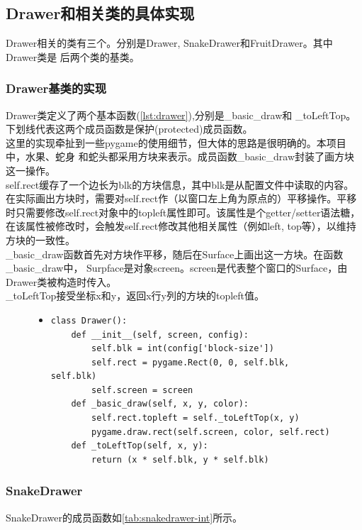 \documentclass[a4paper]{article}
\begin{document}
\subsection{Drawer和相关类的具体实现}
Drawer相关的类有三个。分别是Drawer, SnakeDrawer和FruitDrawer。其中Drawer类是
后两个类的基类。
\subsubsection{Drawer基类的实现}
Drawer类定义了两个基本函数(\autoref{lst:drawer}),分别是\_basic\_draw和
\_toLeftTop。下划线代表这两个成员函数是保护(protected)成员函数。\\

这里的实现牵扯到一些pygame的使用细节，但大体的思路是很明确的。本项目中，水果、蛇身
和蛇头都采用方块来表示。成员函数\_basic\_draw封装了画方块这一操作。\\

self.rect缓存了一个边长为blk的方块信息，其中blk是从配置文件中读取的内容。
在实际画出方块时，需要对self.rect作（以窗口左上角为原点的）平移操作。平移
时只需要修改self.rect对象中的topleft属性即可。该属性是个getter/setter语法糖，
在该属性被修改时，会触发self.rect修改其他相关属性（例如left, top等），以维持
方块的一致性。\\

\_basic\_draw函数首先对方块作平移，随后在Surface上画出这一方块。在函数\_basic\_draw中，
Surpface是对象screen。screen是代表整个窗口的Surface，由Drawer类被构造时传入。\\

\_toLeftTop接受坐标x和y，返回x行y列的方块的topleft值。
\begin{figure}[!hbt]
\begin{itemize}
\item[] \begin{lstlisting}[style=mypython, label=lst:drawer, caption=Drawer基类]
class Drawer():
    def __init__(self, screen, config):
        self.blk = int(config['block-size'])
        self.rect = pygame.Rect(0, 0, self.blk, self.blk)
        self.screen = screen
    def _basic_draw(self, x, y, color):
        self.rect.topleft = self._toLeftTop(x, y)
        pygame.draw.rect(self.screen, color, self.rect)
    def _toLeftTop(self, x, y):
        return (x * self.blk, y * self.blk)
\end{lstlisting}
\end{itemize}
\end{figure}

\subsubsection{SnakeDrawer}
SnakeDrawer的成员函数如\autoref{tab:snakedrawer-int}所示。\\
\end{document}

